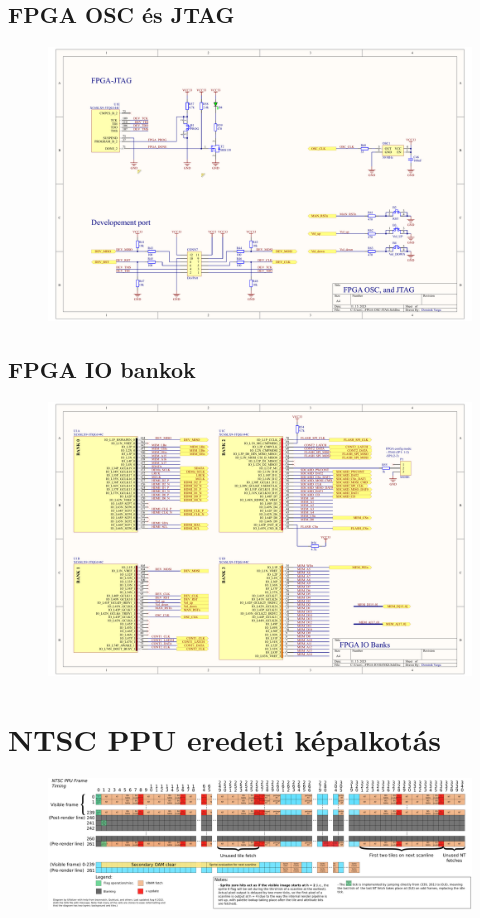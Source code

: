 \subsection{FPGA OSC és JTAG}
\label{sec:OSC-JTAG}
\begin{figure}[H]
	\centering
	\includegraphics[width=220mm, keepaspectratio, angle=90]{figures/JTAG-OSC}
\end{figure}
\subsection{FPGA IO bankok}
\label{sec:FPGA-BANKS}
\begin{figure}[H]
	\centering
	\includegraphics[width=220mm, keepaspectratio, angle=90]{figures/FPGA-BANKS}
\end{figure}

\newpage
\section{NTSC PPU eredeti képalkotás}
\label{sec:NTSC-PPU-frame}
\begin{figure}[H]
	\centering
	\includegraphics[width=230mm, keepaspectratio, angle=90]{figures/PPU-original-rendering}
\end{figure}